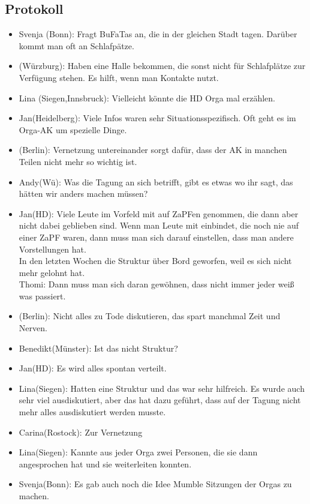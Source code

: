   \subsection*{Protokoll}
    \begin{itemize}
      \item Svenja (Bonn): Fragt BuFaTas an, die in der gleichen Stadt tagen. Darüber kommt man oft an Schlafpätze.
      \item (Würzburg): Haben eine Halle bekommen, die sonst nicht für Schlafplätze zur Verfügung stehen. Es hilft, wenn man Kontakte nutzt.
      \item Lina (Siegen,Innsbruck): Vielleicht könnte die HD Orga mal erzählen.
      \item Jan(Heidelberg): Viele Infos waren sehr Situationsspezifisch. Oft geht es im Orga-AK um spezielle Dinge.
      \item (Berlin): Vernetzung untereinander sorgt dafür, dass der AK in manchen Teilen nicht mehr so wichtig ist.
      \item Andy(Wü): Was die Tagung an sich betrifft, gibt es etwas wo ihr sagt, das hätten wir anders machen müssen?
      \item Jan(HD): Viele Leute im Vorfeld mit auf ZaPFen genommen, die dann aber nicht dabei geblieben sind. Wenn man Leute mit einbindet, die noch nie auf einer ZaPF waren, dann muss man sich darauf einstellen, dass man andere Vorstellungen hat. \\
      In den letzten Wochen die Struktur über Bord geworfen, weil es sich nicht mehr gelohnt hat. \\
      Thomi: Dann muss man sich daran gewöhnen, dass nicht immer jeder weiß was passiert.
      \item (Berlin): Nicht alles zu Tode diskutieren, das spart manchmal Zeit und Nerven.
      \item Benedikt(Münster): Ist das nicht Struktur?
      \item Jan(HD): Es wird alles spontan verteilt.
      \item Lina(Siegen): Hatten eine Struktur und das war sehr hilfreich. Es wurde auch sehr viel ausdiskutiert, aber das hat dazu geführt, dass auf der Tagung nicht mehr alles ausdiskutiert werden musste.
      \item Carina(Rostock): Zur Vernetzung
      \item Lina(Siegen): Kannte aus jeder Orga zwei Personen, die sie dann angesprochen hat und sie weiterleiten konnten.
      \item Svenja(Bonn): Es gab auch noch die Idee Mumble Sitzungen der Orgas zu machen.

\end{itemize}
